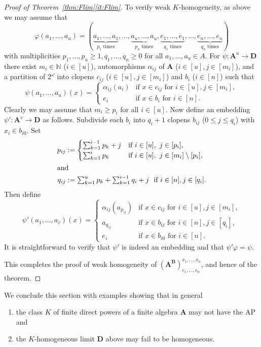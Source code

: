 \documentclass[12pt,a4paper,reqno]{amsart}
\numberwithin{equation}{section}
\theoremstyle{plain}
\theoremstyle{definition}
\newcommand{\A}{\mathbf{A}}
\newcommand{\ABxe}{(\mathbf{A^B})^{x_1,\dots,x_n}_{e_1,\dots,e_n}}
\newcommand{\D}{\mathbf{D}}
\newcommand{\N}{\mathbb{N}}
\begin{document}
\begin{proof}[Proof of Theorem~\ref{thm:Flim}\eqref{it:Flim}]
 
To verify weak $K$-homogeneity, as above we may assume that 
\[ \varphi(a_1,\dots,a_u) = (\underbrace{a_1,\dots,a_1}_{p_1 \text{ times}},\dots,\underbrace{a_u,\dots,a_u}_{p_u \text{ times}},\underbrace{e_1,\dots,e_1}_{q_1 \text{ times}},\dots,\underbrace{e_n,\dots,e_n}_{q_n \text{ times}}) \]
with multiplicities $p_1,\dots,p_u\geq 1, q_1,\dots,q_n\geq 0$ for all $a_1,\dots,a_u\in A$.
 For $\psi\colon \A^u \to \D$ there exist $m_i\in\N$ ($i\in [u]$), automorphisms 
 $\alpha_{ij}$ of $\A$ ($i\in [u], j\in [m_i]$), and  a partition of $2^\omega$ into clopens 
 $c_{ij}$ ($i\in [u], {j\in [m_i]}$) and $b_i$ ($i\in [n]$)  such that
\[ \psi(a_1,\dots,a_u)(x)= \begin{cases} \alpha_{ij}(a_i) & \text{if } x\in c_{ij} \text{ for } i\in [u], j\in [m_i], \\
    e_i & \text{if } x\in b_i \text{ for } i\in [n]. \end{cases} \]
 Clearly we may assume that $m_i \geq p_i$ for all $i\in [u]$. Now define an embedding  $\psi'\colon\A^v\to\D$ as follows.
 Subdivide each $b_i$ into $q_i+1$ clopens $b_{ij}$ ($0\leq j\leq q_i$) with $x_i\in b_{i0}$.
 Set
\begin{align*}
 p_{ij} &:=\begin{cases} \sum_{k=1}^{i-1} p_k+j &\text{if } i\in [u],\ j\in [p_i],\\
\sum_{k=1}^{i} p_k&\text{if } i\in [u],\ j\in [m_i]\setminus [p_i],\\
 \end{cases}
 \\
\intertext{and}
q_{ij}&:= \textstyle\sum_{k=1}^{u} p_k+\sum_{k=1}^{i-1} q_i+j\ \text{ if } i\in [n], j\in [q_i].
 \end{align*}
 Then define
 \[ \psi'(a_1,\dots,a_v)(x)= \begin{cases} \alpha_{ij}(a_{p_{ij}}) & \text{if } x\in c_{ij} \text{ for } i\in [u], j\in [m_i], \\
   
    a_{q_{ij}} & \text{if } x\in b_{ij} \text{ for } i\in [n], j\in [q_i], \\
    e_i & \text{if } x\in b_{i0} \text{ for } i\in [n]. \end{cases} \]
It is straightforward to verify that $\psi'$ is indeed an embedding and that $\psi'\varphi = \psi$.

This completes the proof of weak homogeneity of $\ABxe$, and hence of the theorem.
\end{proof}


 We conclude this section with examples showing that in general 
\begin{enumerate}
\item the class $K$ of finite direct powers of a finite algebra $\A$ may not have the AP and 
\item the $K$-homogeneous limit $\D$ above may fail to be homogeneous.
\end{enumerate}  
\end{document}
